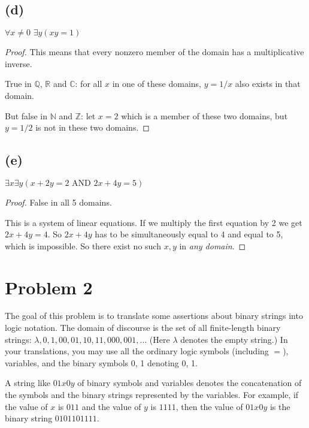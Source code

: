 \documentclass[14pt]{extarticle}
\begin{document}
\subsection{(d)}
$\forall x \neq 0 \,\,\exists y (xy = 1) $
\begin{proof}
    This means that every nonzero member of the domain has a multiplicative inverse.

    True in $\mathbb{Q}$, $\mathbb{R}$ and $\mathbb{C}$: for all $x$ in one of these domains, $y = 1/x$ also exists in that domain.

    But false in $\mathbb{N}$ and $\mathbb{Z}$: let $x = 2$ which is a member of these two domains, but $y = 1/2$ is not in these two domains.
\end{proof}

\subsection{(e)}
$\exists x \exists y (x + 2y = 2 \text{ AND } 2x + 4y = 5)$
\begin{proof}
    False in all 5 domains.

    This is a system of linear equations. If we multiply the first equation by 2 we get $2x + 4y = 4$. So $2x + 4y$ has to be simultaneously equal to 4 and equal to 5, which is impossible. So there exist no such $x, y$ in {\it any domain}.
\end{proof}

\section{Problem 2}
The goal of this problem is to translate some assertions about binary strings into logic notation. The domain of discourse is the set of all finite-length binary strings: $\lambda, 0, 1, 00, 01, 10, 11, 000, 001, \ldots$ (Here $\lambda$ denotes the empty string.) In your translations, you may use all the ordinary logic symbols (including $=$), variables, and the binary symbols 0, 1 denoting 0, 1.

A string like $01x0y$ of binary symbols and variables denotes the concatenation of the symbols and the binary strings represented by the variables. For example, if the value of $x$ is $011$ and the value of $y$ is $1111$, then the value of $01x0y$ is the binary string $0101101111$.
\end{document}

